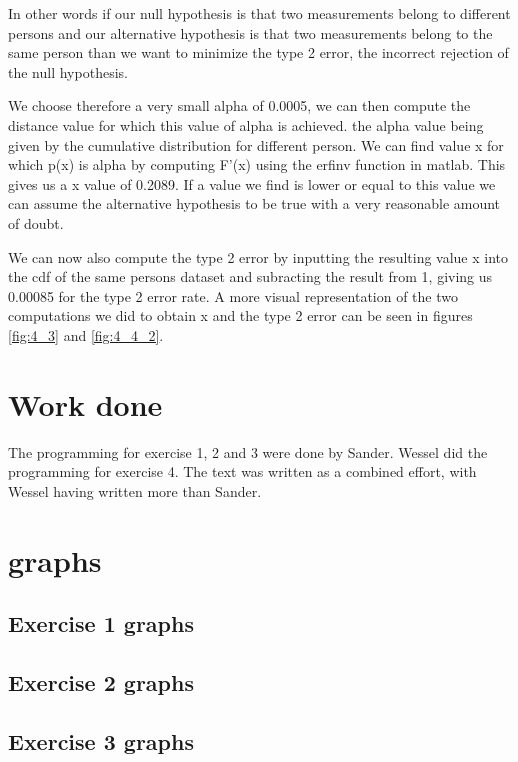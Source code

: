\documentclass[10pt,a4paper]{article}
\begin{document}
In other words if our null hypothesis is that two measurements belong to different persons and our alternative hypothesis is that two measurements belong to the same person than we want to minimize the type 2 error, the incorrect rejection of the null hypothesis. 

We choose therefore a very small alpha of 0.0005, we can then compute the distance value for which this value of alpha is achieved. the alpha value being given by the cumulative distribution for different person. We can find value x for which p(x) is alpha by computing F'(x) using the erfinv function in matlab. This gives us a x value of 0.2089. If a value we find is lower or equal to this value we can assume the alternative hypothesis to be true with a very reasonable amount of doubt.

We can now also compute the type 2 error by inputting the resulting value x into the cdf of the same persons dataset and subracting the result from 1, giving us 0.00085 for the type 2 error rate. A more visual representation of the two computations we did to obtain x and the type 2 error can be seen in figures \ref{fig:4_3} and \ref{fig:4_4_2}.

\section{Work done}
The programming for exercise 1, 2 and 3 were done by Sander. Wessel did the programming for exercise 4. The text was written as a combined effort, with Wessel having written more than Sander.

\appendix
\section{graphs}
\subsection{Exercise 1 graphs}

\subsection{Exercise 2 graphs}

\subsection{Exercise 3 graphs}
\end{document}
